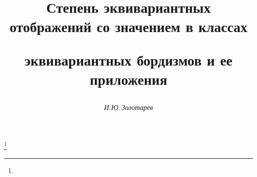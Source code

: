 

 


% 


\newcommand{\la}{\langle} 


\newcommand{\ra}{\rangle} 




\newcommand{\Id}{\operatorname{Id}} 


\newcommand{\Fix}{\operatorname{Fix}} 


\newcommand{\tts}[1]{}  


 




\setcounter{page}{17} 












 


\author{\it И.Ю.\,Золотарев} 




\title{Степень эквивариантных отображений со значением в классах  


эквивариантных бордизмов и ее приложения} 


\thanks{} 


 


\date{} 




\pagestyle{plain} %


 




